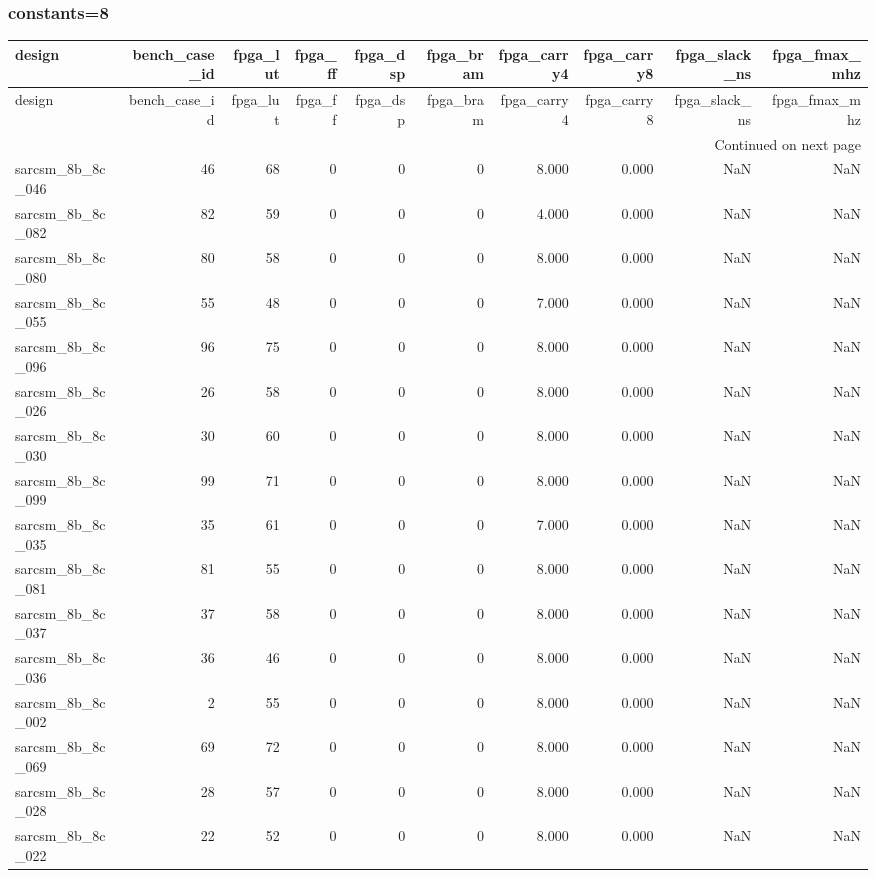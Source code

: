 \documentclass{article}
\begin{document}
\subsubsection*{constants=8}
\begin{longtable}{lrrrrrrrrr}
\toprule
design & bench\_case\_id & fpga\_lut & fpga\_ff & fpga\_dsp & fpga\_bram & fpga\_carry4 & fpga\_carry8 & fpga\_slack\_ns & fpga\_fmax\_mhz \\
\midrule
\endfirsthead
\toprule
design & bench\_case\_id & fpga\_lut & fpga\_ff & fpga\_dsp & fpga\_bram & fpga\_carry4 & fpga\_carry8 & fpga\_slack\_ns & fpga\_fmax\_mhz \\
\midrule
\endhead
\midrule
\multicolumn{10}{r}{Continued on next page} \\
\midrule
\endfoot
\bottomrule
\endlastfoot
sarcsm\_8b\_8c\_046 & 46 & 68 & 0 & 0 & 0 & 8.000 & 0.000 & NaN & NaN \\
sarcsm\_8b\_8c\_082 & 82 & 59 & 0 & 0 & 0 & 4.000 & 0.000 & NaN & NaN \\
sarcsm\_8b\_8c\_080 & 80 & 58 & 0 & 0 & 0 & 8.000 & 0.000 & NaN & NaN \\
sarcsm\_8b\_8c\_055 & 55 & 48 & 0 & 0 & 0 & 7.000 & 0.000 & NaN & NaN \\
sarcsm\_8b\_8c\_096 & 96 & 75 & 0 & 0 & 0 & 8.000 & 0.000 & NaN & NaN \\
sarcsm\_8b\_8c\_026 & 26 & 58 & 0 & 0 & 0 & 8.000 & 0.000 & NaN & NaN \\
sarcsm\_8b\_8c\_030 & 30 & 60 & 0 & 0 & 0 & 8.000 & 0.000 & NaN & NaN \\
sarcsm\_8b\_8c\_099 & 99 & 71 & 0 & 0 & 0 & 8.000 & 0.000 & NaN & NaN \\
sarcsm\_8b\_8c\_035 & 35 & 61 & 0 & 0 & 0 & 7.000 & 0.000 & NaN & NaN \\
sarcsm\_8b\_8c\_081 & 81 & 55 & 0 & 0 & 0 & 8.000 & 0.000 & NaN & NaN \\
sarcsm\_8b\_8c\_037 & 37 & 58 & 0 & 0 & 0 & 8.000 & 0.000 & NaN & NaN \\
sarcsm\_8b\_8c\_036 & 36 & 46 & 0 & 0 & 0 & 8.000 & 0.000 & NaN & NaN \\
sarcsm\_8b\_8c\_002 & 2 & 55 & 0 & 0 & 0 & 8.000 & 0.000 & NaN & NaN \\
sarcsm\_8b\_8c\_069 & 69 & 72 & 0 & 0 & 0 & 8.000 & 0.000 & NaN & NaN \\
sarcsm\_8b\_8c\_028 & 28 & 57 & 0 & 0 & 0 & 8.000 & 0.000 & NaN & NaN \\
sarcsm\_8b\_8c\_022 & 22 & 52 & 0 & 0 & 0 & 8.000 & 0.000 & NaN & NaN \\

\end{longtable}
\end{document}
